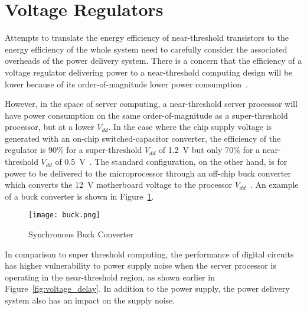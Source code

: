 \section{Voltage Regulators}
\label{sec:regulators}

Attempts to translate the energy efficiency of near-threshold transistors to the energy efficiency of the whole system need to carefully consider the associated overheads of the power delivery system.
There is a concern that the efficiency of a voltage regulator delivering power to a near-threshold computing design will be lower because of its order-of-magnitude lower power consumption~\cite{ISLPED:2011}.

However, in the space of server computing, a near-threshold server processor will have power consumption on the same order-of-magnitude as a super-threshold processor, but at a lower $V_{dd}$.
In the case where the chip supply voltage is generated with an on-chip switched-capacitor converter, the efficiency of the regulator is 90\% for a super-threshold $V_{dd}$ of \SI{1.2}{\volt} but only 70\% for a near-threshold $V_{dd}$ of \SI{0.5}{\volt}~\cite{Pitfall:2010}.
The standard configuration, on the other hand, is for power to be delivered to the microprocessor through an off-chip buck converter which converts the \SI{12}{\volt} motherboard voltage to the processor $V_{dd}$~\cite{Server:2006}.
An example of a buck converter is shown in Figure~\ref{fig:buck}.

\begin{figure}[thpb]
\centering
\texttt{[image: buck.png]}
\label{fig:buck}
\caption{Synchronous Buck Converter}
\end{figure}

In comparison to super threshold computing, the performance of digital circuits has higher vulnerability to power supply noise when the server processor is operating in the near-threshold region, as shown earlier in Figure~\ref{fig:voltage_delay}. In addition to the power supply, the power delivery system also has an impact on the supply noise.

